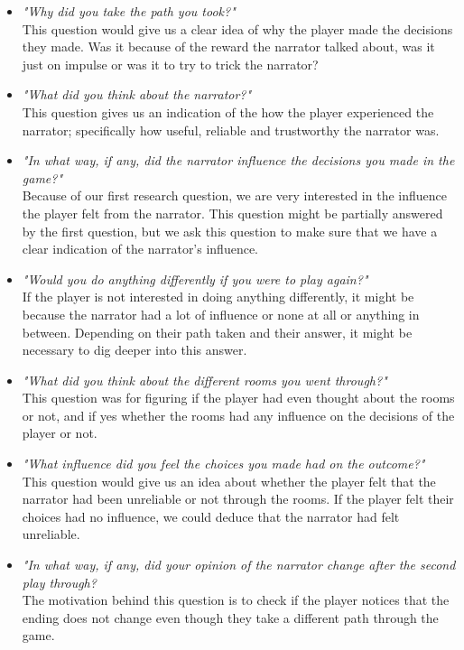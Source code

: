 \begin{itemize}

	\item \textit{"Why did you take the path you took?"} \\
 		This question would give us a clear idea of why the player made the decisions they made. Was it because of the reward the narrator talked about, was it just on impulse or was it to try to trick the narrator? \\

	\item \textit{"What did you think about the narrator?"} \\
		 This question gives us an indication of the how the player experienced the narrator; specifically how useful, reliable and trustworthy the narrator was. \\

	\item \textit{"In what way, if any, did the narrator influence the decisions you made in the game?"} \\
		 Because of our first research question, we are very interested in the influence the player felt from the narrator. This question might be partially answered by the first question, but we ask this question to make sure that we have a clear indication of the narrator's influence. \\

	\item \textit{"Would you do anything differently if you were to play again?"} \\
		 If the player is not interested in doing anything differently, it might be because the narrator had a lot of influence or none at all or anything in between. Depending on their path taken and their answer, it might be necessary to dig deeper into this answer. \\
	\item \textit{"What did you think about the different rooms you went through?"} \\
		 This question was for figuring if the player had even thought about the rooms or not, and if yes whether the rooms had any influence on the decisions of the player or not. \\

	\item \textit{"What influence did you feel the choices you made had on the outcome?"} \\
		 This question would give us an idea about whether the player felt that the narrator had been unreliable or not through the rooms. If the player felt their choices had no influence, we could deduce that the narrator had felt unreliable. \\

	\item \textit{"In what way, if any, did your opinion of the narrator change after the second play through?} \\
		  The motivation behind this question is to check if the player notices that the ending does not change even though they take a different path through the game.
\end{itemize}

